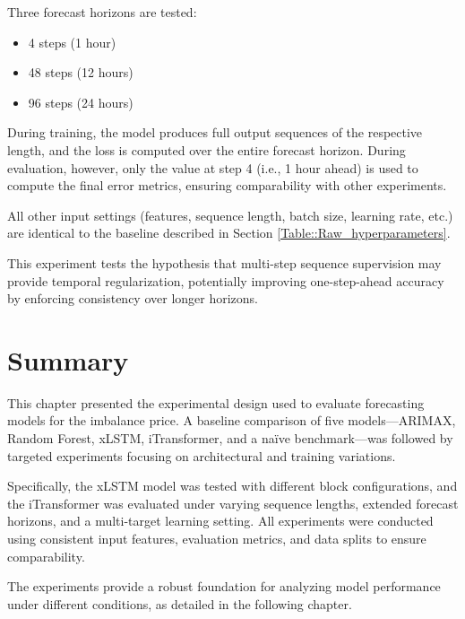 \documentclass[class=scrbook, crop=false]{standalone}
\begin{document}
Three forecast horizons are tested:
\begin{itemize}
\item 4 steps (1 hour)
\item 48 steps (12 hours)
\item 96 steps (24 hours)
\end{itemize}

During training, the model produces full output sequences of the respective length, and the loss is computed over the entire forecast horizon. During evaluation, however, only the value at step 4 (i.e., 1 hour ahead) is used to compute the final error metrics, ensuring comparability with other experiments.

All other input settings (features, sequence length, batch size, learning rate, etc.) are identical to the baseline described in Section \ref{Table::Raw_hyperparameters}.

This experiment tests the hypothesis that multi-step sequence supervision may provide temporal regularization, potentially improving one-step-ahead accuracy by enforcing consistency over longer horizons.

\section{Summary}
This chapter presented the experimental design used to evaluate forecasting models for the imbalance price. A baseline comparison of five models—ARIMAX, Random Forest, xLSTM, iTransformer, and a naïve benchmark—was followed by targeted experiments focusing on architectural and training variations.

Specifically, the xLSTM model was tested with different block configurations, and the iTransformer was evaluated under varying sequence lengths, extended forecast horizons, and a multi-target learning setting. All experiments were conducted using consistent input features, evaluation metrics, and data splits to ensure comparability.

The experiments provide a robust foundation for analyzing model performance under different conditions, as detailed in the following chapter.
\end{document}
